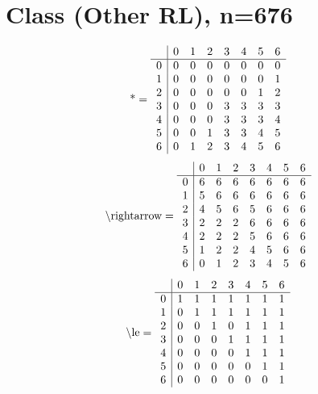 \documentclass[11pt]{article}
\begin{document}
\section{Class (Other RL), n=676}
\[\text{*} = 
\begin{array}{r | r r r r r r r}
 & 0 & 1 & 2 & 3 & 4 & 5 & 6 \\ \hline
0 & 0 & 0 & 0 & 0 & 0 & 0 & 0 \\
1 & 0 & 0 & 0 & 0 & 0 & 0 & 1 \\
2 & 0 & 0 & 0 & 0 & 0 & 1 & 2 \\
3 & 0 & 0 & 0 & 3 & 3 & 3 & 3 \\
4 & 0 & 0 & 0 & 3 & 3 & 3 & 4 \\
5 & 0 & 0 & 1 & 3 & 3 & 4 & 5 \\
6 & 0 & 1 & 2 & 3 & 4 & 5 & 6 \\
\end{array}
\]
\[\text{\textbackslash rightarrow} = 
\begin{array}{r | r r r r r r r}
 & 0 & 1 & 2 & 3 & 4 & 5 & 6 \\ \hline
0 & 6 & 6 & 6 & 6 & 6 & 6 & 6 \\
1 & 5 & 6 & 6 & 6 & 6 & 6 & 6 \\
2 & 4 & 5 & 6 & 5 & 6 & 6 & 6 \\
3 & 2 & 2 & 2 & 6 & 6 & 6 & 6 \\
4 & 2 & 2 & 2 & 5 & 6 & 6 & 6 \\
5 & 1 & 2 & 2 & 4 & 5 & 6 & 6 \\
6 & 0 & 1 & 2 & 3 & 4 & 5 & 6 \\
\end{array}
\]
\[\text{\textbackslash le} = 
\begin{array}{r | r r r r r r r}
 & 0 & 1 & 2 & 3 & 4 & 5 & 6 \\ \hline
0 & 1 & 1 & 1 & 1 & 1 & 1 & 1 \\
1 & 0 & 1 & 1 & 1 & 1 & 1 & 1 \\
2 & 0 & 0 & 1 & 0 & 1 & 1 & 1 \\
3 & 0 & 0 & 0 & 1 & 1 & 1 & 1 \\
4 & 0 & 0 & 0 & 0 & 1 & 1 & 1 \\
5 & 0 & 0 & 0 & 0 & 0 & 1 & 1 \\
6 & 0 & 0 & 0 & 0 & 0 & 0 & 1 \\
\end{array}
\]
\end{document}
